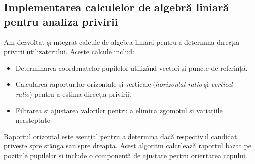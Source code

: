 \documentclass[12pt,a4paper]{article}
\begin{document}
\subsection{Implementarea calculelor de algebră liniară pentru analiza privirii}
Am dezvoltat și integrat calcule de algebră liniară pentru a determina direcția privirii utilizatorului. Aceste calcule includ:
\begin{itemize}
    \item Determinarea coordonatelor pupilelor utilizând vectori și puncte de referință.
    \item Calcularea raporturilor orizontale și verticale (\textit{horizontal ratio} și \textit{vertical ratio}) pentru a estima direcția privirii.
    \item Filtrarea și ajustarea valorilor pentru a elimina zgomotul și variațiile neașteptate.
\end{itemize}

Raportul orizontal este esențial pentru a determina dacă respectivul candidat privește spre stânga sau spre dreapta. Acest algoritm calculează raportul bazat pe pozițiile pupilelor și include o componentă de ajustare pentru orientarea capului.
\end{document}
